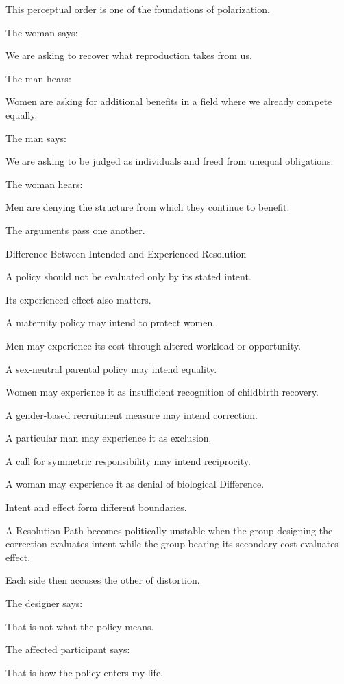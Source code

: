 This perceptual order is one of the foundations of polarization.

The woman says:

We are asking to recover what reproduction takes from us.

The man hears:

Women are asking for additional benefits in a field where we already compete equally.

The man says:

We are asking to be judged as individuals and freed from unequal obligations.

The woman hears:

Men are denying the structure from which they continue to benefit.

The arguments pass one another.

Difference Between Intended and Experienced Resolution

A policy should not be evaluated only by its stated intent.

Its experienced effect also matters.

A maternity policy may intend to protect women.

Men may experience its cost through altered workload or opportunity.

A sex-neutral parental policy may intend equality.

Women may experience it as insufficient recognition of childbirth recovery.

A gender-based recruitment measure may intend correction.

A particular man may experience it as exclusion.

A call for symmetric responsibility may intend reciprocity.

A woman may experience it as denial of biological Difference.

Intent and effect form different boundaries.

A Resolution Path becomes politically unstable when the group designing the correction evaluates intent while the group bearing its secondary cost evaluates effect.

Each side then accuses the other of distortion.

The designer says:

That is not what the policy means.

The affected participant says:

That is how the policy enters my life.

